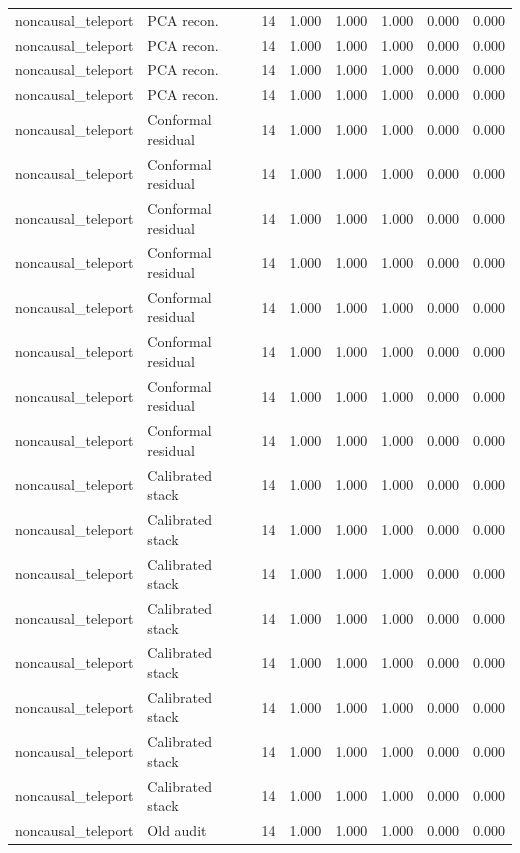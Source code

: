 {\begin{longtable}{llrrrrrr}
noncausal\_teleport & PCA recon. & 14 & 1.000 & 1.000 & 1.000 & 0.000 & 0.000 \\
noncausal\_teleport & PCA recon. & 14 & 1.000 & 1.000 & 1.000 & 0.000 & 0.000 \\
noncausal\_teleport & PCA recon. & 14 & 1.000 & 1.000 & 1.000 & 0.000 & 0.000 \\
noncausal\_teleport & PCA recon. & 14 & 1.000 & 1.000 & 1.000 & 0.000 & 0.000 \\
noncausal\_teleport & Conformal residual & 14 & 1.000 & 1.000 & 1.000 & 0.000 & 0.000 \\
noncausal\_teleport & Conformal residual & 14 & 1.000 & 1.000 & 1.000 & 0.000 & 0.000 \\
noncausal\_teleport & Conformal residual & 14 & 1.000 & 1.000 & 1.000 & 0.000 & 0.000 \\
noncausal\_teleport & Conformal residual & 14 & 1.000 & 1.000 & 1.000 & 0.000 & 0.000 \\
noncausal\_teleport & Conformal residual & 14 & 1.000 & 1.000 & 1.000 & 0.000 & 0.000 \\
noncausal\_teleport & Conformal residual & 14 & 1.000 & 1.000 & 1.000 & 0.000 & 0.000 \\
noncausal\_teleport & Conformal residual & 14 & 1.000 & 1.000 & 1.000 & 0.000 & 0.000 \\
noncausal\_teleport & Conformal residual & 14 & 1.000 & 1.000 & 1.000 & 0.000 & 0.000 \\
noncausal\_teleport & Calibrated stack & 14 & 1.000 & 1.000 & 1.000 & 0.000 & 0.000 \\
noncausal\_teleport & Calibrated stack & 14 & 1.000 & 1.000 & 1.000 & 0.000 & 0.000 \\
noncausal\_teleport & Calibrated stack & 14 & 1.000 & 1.000 & 1.000 & 0.000 & 0.000 \\
noncausal\_teleport & Calibrated stack & 14 & 1.000 & 1.000 & 1.000 & 0.000 & 0.000 \\
noncausal\_teleport & Calibrated stack & 14 & 1.000 & 1.000 & 1.000 & 0.000 & 0.000 \\
noncausal\_teleport & Calibrated stack & 14 & 1.000 & 1.000 & 1.000 & 0.000 & 0.000 \\
noncausal\_teleport & Calibrated stack & 14 & 1.000 & 1.000 & 1.000 & 0.000 & 0.000 \\
noncausal\_teleport & Calibrated stack & 14 & 1.000 & 1.000 & 1.000 & 0.000 & 0.000 \\
noncausal\_teleport & Old audit & 14 & 1.000 & 1.000 & 1.000 & 0.000 & 0.000 \\

\end{longtable}}
